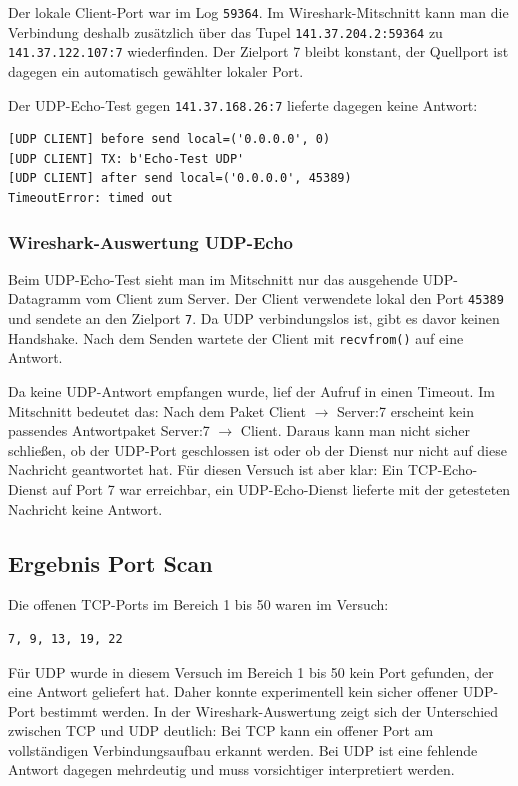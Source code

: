 \documentclass{kdiartcl}
\begin{document}
Der lokale Client-Port war im Log \texttt{59364}. Im Wireshark-Mitschnitt kann man die Verbindung deshalb zusätzlich über das Tupel \texttt{141.37.204.2:59364} zu \texttt{141.37.122.107:7} wiederfinden. Der Zielport 7 bleibt konstant, der Quellport ist dagegen ein automatisch gewählter lokaler Port.

Der UDP-Echo-Test gegen \texttt{141.37.168.26:7} lieferte dagegen keine Antwort:

\begin{verbatim}
[UDP CLIENT] before send local=('0.0.0.0', 0)
[UDP CLIENT] TX: b'Echo-Test UDP'
[UDP CLIENT] after send local=('0.0.0.0', 45389)
TimeoutError: timed out
\end{verbatim}

\subsubsection{Wireshark-Auswertung UDP-Echo}

Beim UDP-Echo-Test sieht man im Mitschnitt nur das ausgehende UDP-Datagramm vom Client zum Server. Der Client verwendete lokal den Port \texttt{45389} und sendete an den Zielport \texttt{7}. Da UDP verbindungslos ist, gibt es davor keinen Handshake. Nach dem Senden wartete der Client mit \texttt{recvfrom()} auf eine Antwort.

Da keine UDP-Antwort empfangen wurde, lief der Aufruf in einen Timeout. Im Mitschnitt bedeutet das: Nach dem Paket Client $\rightarrow$ Server:7 erscheint kein passendes Antwortpaket Server:7 $\rightarrow$ Client. Daraus kann man nicht sicher schließen, ob der UDP-Port geschlossen ist oder ob der Dienst nur nicht auf diese Nachricht geantwortet hat. Für diesen Versuch ist aber klar: Ein TCP-Echo-Dienst auf Port 7 war erreichbar, ein UDP-Echo-Dienst lieferte mit der getesteten Nachricht keine Antwort.

\subsection{Ergebnis Port Scan}

Die offenen TCP-Ports im Bereich 1 bis 50 waren im Versuch:

\begin{verbatim}
7, 9, 13, 19, 22
\end{verbatim}

Für UDP wurde in diesem Versuch im Bereich 1 bis 50 kein Port gefunden, der eine Antwort geliefert hat. Daher konnte experimentell kein sicher offener UDP-Port bestimmt werden. In der Wireshark-Auswertung zeigt sich der Unterschied zwischen TCP und UDP deutlich: Bei TCP kann ein offener Port am vollständigen Verbindungsaufbau erkannt werden. Bei UDP ist eine fehlende Antwort dagegen mehrdeutig und muss vorsichtiger interpretiert werden.
\end{document}
